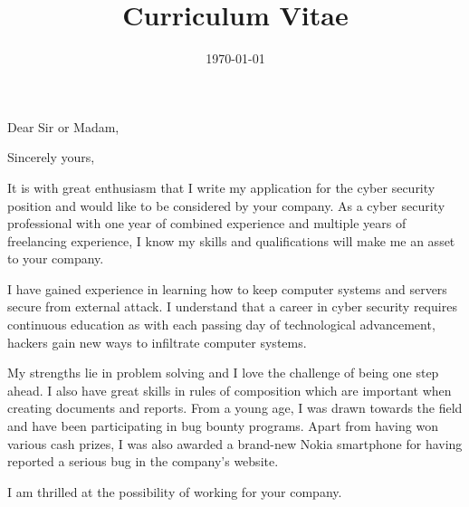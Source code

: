 \documentclass[11pt,a4paper,sans]{moderncv} %
\title{Curriculum Vitae}
\begin{document}



\clearpage

\date{\today} %
\opening{Dear Sir or Madam,} %
\closing{Sincerely yours,} %

\makelettertitle %

\begin{flushleft}
It is with great enthusiasm that I write my application for the cyber security position and would like to be considered by your company. As a cyber security professional with one year of combined experience and multiple years of freelancing experience, I know my skills and qualifications will make me an asset to your company.

I have gained experience in learning how to keep computer systems and servers secure from external attack. I understand that a career in cyber security requires continuous education as with each passing day of technological advancement, hackers gain new ways to infiltrate computer systems. 


My strengths lie in problem solving and I love the challenge of being one step ahead. I also have great skills in rules of composition which are important when creating documents and reports. From a young age, I was drawn towards the field and have been participating in bug bounty programs. Apart from having won various cash prizes, I was also awarded a brand-new Nokia smartphone for having reported a serious bug in the company’s website.


I am thrilled at the possibility of working for your company.

\end{flushleft}
\makeletterclosing %

\newpage{}

\end{document}
